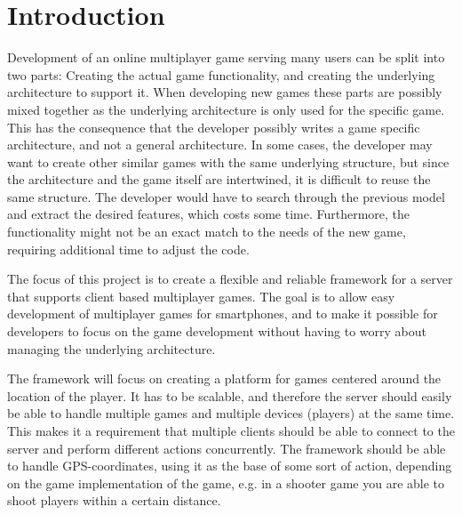 \chapter{Introduction}
\label{chap:intro}




Development of an online multiplayer game serving many users can be split into two parts: Creating the actual game functionality, and creating the underlying architecture to support it. When developing new games these parts are possibly mixed together as the underlying architecture is only used for the specific game. This has the consequence that the developer possibly writes a game specific architecture, and not a general architecture. In some cases, the developer may want to create other similar games with the same underlying structure, but since the architecture and the game itself are intertwined, it is difficult to reuse the same structure. The developer would have to search through the previous model and extract the desired features, which costs some time. Furthermore, the functionality might not be an exact match to the needs of the new game, requiring additional time to adjust the code.

The focus of this project is to create a flexible and reliable framework for a server that supports client based multiplayer games. The goal is to allow easy development of multiplayer games for smartphones, and to make it possible for developers to focus on the game development without having to worry about managing the underlying architecture.

The framework will focus on creating a platform for games centered around the location of the player. It has to be scalable, and therefore the server should easily be able to handle multiple games and multiple devices (players) at the same time. This makes it a requirement that multiple clients should be able to connect to the server and perform different actions concurrently. The framework should be able to handle GPS-coordinates, using it as the base of some sort of action, depending on the game implementation of the game, e.g. in a shooter game you are able to shoot players within a certain distance. 

